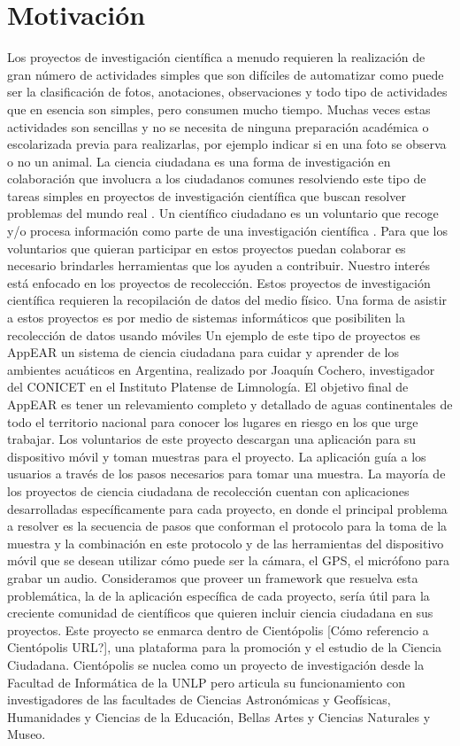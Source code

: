 \section{ Motivación }

Los proyectos de investigación científica a menudo requieren la realización de gran número de actividades simples que son difíciles de automatizar como puede ser la clasificación de fotos, anotaciones, observaciones y todo tipo de actividades que en esencia son simples, pero consumen mucho tiempo. Muchas veces estas actividades son sencillas y no se necesita de ninguna preparación académica o escolarizada previa para realizarlas, por ejemplo indicar si en una foto se observa o no un animal. La ciencia ciudadana es una forma de investigación en colaboración que involucra a los ciudadanos comunes resolviendo este tipo de tareas simples en proyectos de investigación científica que buscan resolver problemas del mundo real \cite{wiggins2011conservation}. Un científico ciudadano es un voluntario que recoge y/o procesa información como parte de una investigación científica \cite{silvertown2009new}. Para que los voluntarios que quieran participar en estos proyectos puedan colaborar es necesario brindarles herramientas que los ayuden a contribuir. 
Nuestro interés está enfocado en los proyectos de recolección. Estos proyectos de investigación científica requieren la recopilación de datos del medio físico. Una forma de asistir a estos proyectos es por medio de sistemas informáticos que posibiliten la recolección de datos usando móviles
Un ejemplo de este tipo de proyectos es AppEAR un sistema de ciencia ciudadana para cuidar y aprender de los ambientes acuáticos en Argentina, realizado por Joaquín Cochero, investigador del CONICET en el Instituto Platense de Limnología. El objetivo final de AppEAR es tener un relevamiento completo y detallado de aguas continentales de todo el territorio nacional para conocer los lugares en riesgo en los que urge trabajar. Los voluntarios de este proyecto descargan una aplicación para su dispositivo móvil y toman muestras para el proyecto. La aplicación guía a los usuarios a través de los pasos necesarios para tomar una muestra.
La mayoría de los proyectos de ciencia ciudadana de recolección cuentan con aplicaciones desarrolladas específicamente para cada proyecto, en donde el principal problema a resolver es la secuencia de pasos que conforman el protocolo para la toma de la muestra y la combinación en este protocolo  y de las herramientas del dispositivo móvil que se desean utilizar cómo puede ser la cámara, el GPS, el micrófono para grabar un audio. Consideramos que proveer un framework que resuelva esta problemática, la de la aplicación específica de cada proyecto, sería útil para la creciente comunidad de científicos que quieren incluir ciencia ciudadana en sus proyectos.
Este proyecto se enmarca dentro de Cientópolis [Cómo referencio a Cientópolis URL?], una plataforma para la promoción y el estudio de la Ciencia Ciudadana. Cientópolis se nuclea como un proyecto de investigación desde la Facultad de Informática de la UNLP pero articula su funcionamiento con investigadores de las facultades de Ciencias Astronómicas y Geofísicas, Humanidades y Ciencias de la Educación, Bellas Artes y Ciencias Naturales y Museo.

